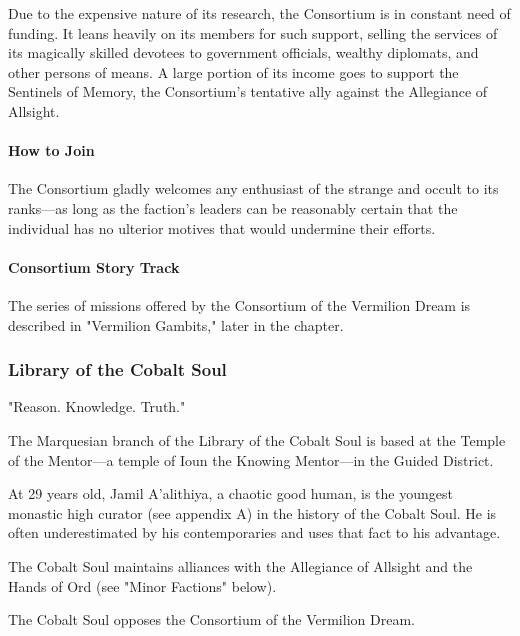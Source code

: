 \documentclass[10pt,a4paper,twoside,twocolumn,openany,nodeprecatedcode]{dndbook}
\begin{document}
Due to the expensive nature of its research, the Consortium is in constant need of funding. It leans heavily on its members for such support, selling the services of its magically skilled devotees to government officials, wealthy diplomats, and other persons of means. A large portion of its income goes to support the Sentinels of Memory, the Consortium's tentative ally against the Allegiance of Allsight.

\paragraph{How to Join}
The Consortium gladly welcomes any enthusiast of the strange and occult to its ranks—as long as the faction's leaders can be reasonably certain that the individual has no ulterior motives that would undermine their efforts.

\paragraph{Consortium Story Track}
The series of missions offered by the Consortium of the Vermilion Dream is described in "Vermilion Gambits," later in the chapter.


\subsubsection{Library of the Cobalt Soul}
"Reason. Knowledge. Truth."


\begin{description}[nolistsep]
\item[Headquarters.]
The Marquesian branch of the Library of the Cobalt Soul is based at the Temple of the Mentor—a temple of Ioun the Knowing Mentor—in the Guided District.
\end{description}

\begin{description}[nolistsep]
\item[Leader.]
At 29 years old, Jamil A'alithiya, a chaotic good human, is the youngest monastic high curator (see appendix A) in the history of the Cobalt Soul. He is often underestimated by his contemporaries and uses that fact to his advantage.
\item[Allies.]
The Cobalt Soul maintains alliances with the Allegiance of Allsight and the Hands of Ord (see "Minor Factions" below).
\item[Opponents.]
The Cobalt Soul opposes the Consortium of the Vermilion Dream.
\end{description}
\end{document}
